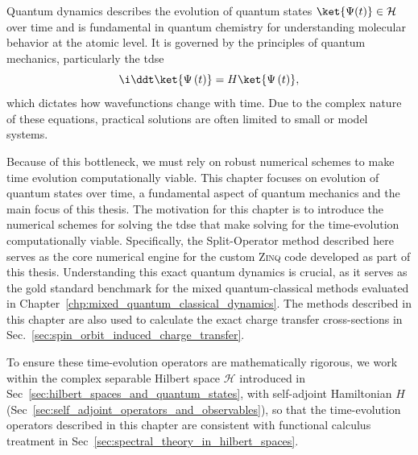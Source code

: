 \chapter{\foldertotitle}\label{chp:time_evolution}
Quantum dynamics describes the evolution of quantum states $\ket{\Psi(t)}\in\mathcal{H}$ over time and is fundamental in quantum chemistry for understanding molecular behavior at the atomic level. It is governed by the principles of quantum mechanics, particularly the \acrfull{tdse}
\begin{equation}\label{eq:tdse}
\i\ddt\ket{\Psi\left(t\right)}=H\ket{\Psi\left(t\right)},
\end{equation}
which dictates how wavefunctions change with time. Due to the complex nature of these equations, practical solutions are often limited to small or model systems.

Because of this bottleneck, we must rely on robust numerical schemes to make time evolution computationally viable. This chapter focuses on evolution of quantum states over time, a fundamental aspect of quantum mechanics and the main focus of this thesis. The motivation for this chapter is to introduce the numerical schemes for solving the \acrshort{tdse} that make solving for the time-evolution computationally viable. Specifically, the Split-Operator method described here serves as the core numerical engine for the custom \textsc{Zinq} code developed as part of this thesis.\supercite{10.5281/zenodo.18386143} Understanding this exact quantum dynamics is crucial, as it serves as the gold standard benchmark for the mixed quantum-classical methods evaluated in Chapter~\ref{chp:mixed_quantum_classical_dynamics}. The methods described in this chapter are also used to calculate the exact charge transfer cross-sections in Sec.~\ref{sec:spin_orbit_induced_charge_transfer}.

To ensure these time-evolution operators are mathematically rigorous, we work within the complex separable Hilbert space $\mathcal{H}$ introduced in Sec~\ref{sec:hilbert_spaces_and_quantum_states}, with self-adjoint Hamiltonian $H$ (Sec~\ref{sec:self_adjoint_operators_and_observables}), so that the time-evolution operators described in this chapter are consistent with functional calculus treatment in Sec~\ref{sec:spectral_theory_in_hilbert_spaces}.
